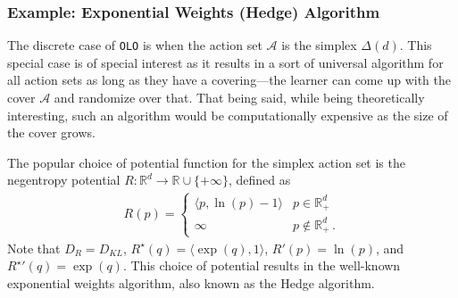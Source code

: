\documentclass{article}
\theoremstyle{plain}
\theoremstyle{definition}
\newcommand{\R}{\mathbb R}
\newcommand{\Rd}{\mathbb{R}^d}
\newcommand{\cA}{\mathcal A}
\newcommand{\Hedge}{\textsf{Hedge}\xspace}
\newcommand{\olo}{\texttt{OLO}\xspace}
\begin{document}
\subsubsection{Example: Exponential Weights (\Hedge) Algorithm}
\label{sec:hedge}
The discrete case of \olo is when the action set $\cA$ is the simplex $\Delta(d)$.
This special case is of
special interest as it results in a sort of universal algorithm for all
action sets as long as they have a covering---the learner
can come up with the cover $\cA$ and randomize over that.
That being said, while being theoretically interesting, such an algorithm
would be computationally expensive as the size of the cover grows.

The popular choice of potential function for the simplex action set
is the negentropy potential $R: \Rd \to \R \cup \{+\infty\}$, defined as
\begin{align*}
    R(p) = \begin{cases}
               \langle p, \ln(p) - 1 \rangle & p \in \Rd_+       \\
               \infty                        & p \notin \Rd_+\,.
           \end{cases}
\end{align*}
Note that $D_R = D_{KL}$, $R^\star(q) = \langle \exp(q), 1\rangle$,
$R'(p) = \ln(p)$, and ${R^\star}'(q) = \exp(q)$.
This choice of potential results in the well-known exponential weights algorithm, also known as the \Hedge algorithm.
\end{document}
